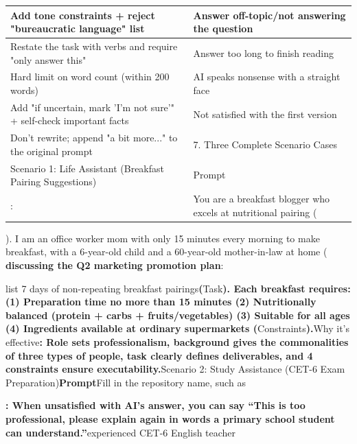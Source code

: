 \begin{center}
\begin{tabularx}{\linewidth}{|X|X|}
\hline
\textbf{Add tone constraints + reject "bureaucratic language" list} & \textbf{Answer off-topic/not answering the question} \tabularnewline
\hline
Restate the task with verbs and require "only answer this" & Answer too long to finish reading \tabularnewline
Hard limit on word count (within 200 words) & AI speaks nonsense with a straight face \tabularnewline
Add "if uncertain, mark 'I'm not sure'" + self-check important facts & Not satisfied with the first version \tabularnewline
Don't rewrite; append "a bit more..." to the original prompt & 7. Three Complete Scenario Cases \tabularnewline
Scenario 1: Life Assistant (Breakfast Pairing Suggestions) & Prompt \tabularnewline
: & You are a breakfast blogger who excels at nutritional pairing ( \tabularnewline
\hline
\end{tabularx}
\end{center}


\begin{tcbinfo}{). I am an office worker mom with only 15 minutes every morning to make breakfast, with a 6-year-old child and a 60-year-old mother-in-law at home (}
\textbf{discussing the Q2 marketing promotion plan}:

list 7 days of non-repeating breakfast pairings\textbf{(}Task\textbf{). Each breakfast requires: (1) Preparation time no more than 15 minutes (2) Nutritionally balanced (protein + carbs + fruits/vegetables) (3) Suitable for all ages (4) Ingredients available at ordinary supermarkets (}Constraints\textbf{).}Why it's effective\textbf{: Role sets professionalism, background gives the commonalities of three types of people, task clearly defines deliverables, and 4 constraints ensure executability.}Scenario 2: Study Assistance (CET-6 Exam Preparation)\textbf{Prompt}Fill in the repository name, such as

\textbf{: When unsatisfied with AI's answer, you can say “This is too professional, please explain again in words a primary school student can understand.”}experienced CET-6 English teacher

\end{tcbinfo}

